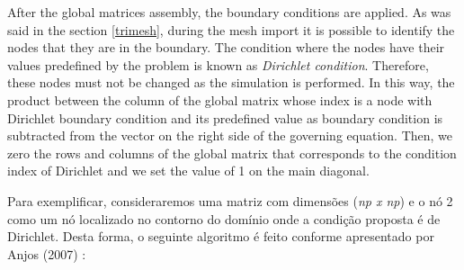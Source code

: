 After the global matrices assembly, the boundary conditions are applied. 
As was said in the section \ref{trimesh}, during the mesh import 
it is possible to identify the nodes that they are in the boundary. 
The condition where the nodes have their values predefined 
by the problem is known as \textit{Dirichlet condition}. 
Therefore, these nodes must not be changed as the simulation is 
performed. In this way, the product between the column of the 
global matrix whose index is a node with Dirichlet boundary condition 
and its predefined value as boundary condition is subtracted from 
the vector on the right side of the governing equation. 
Then, we zero the rows and columns of the global matrix that 
corresponds to the condition index of Dirichlet and we set the value 
of 1 on the main diagonal.

\medskip
Para exemplificar, consideraremos uma matriz 
com dimensões (\textit{np x np})
e o nó 2 como um nó localizado no
contorno do domínio onde a condição proposta
é de Dirichlet.
Desta forma, o seguinte algoritmo é feito conforme apresentado por Anjos (2007) \cite{anjos2007}:

